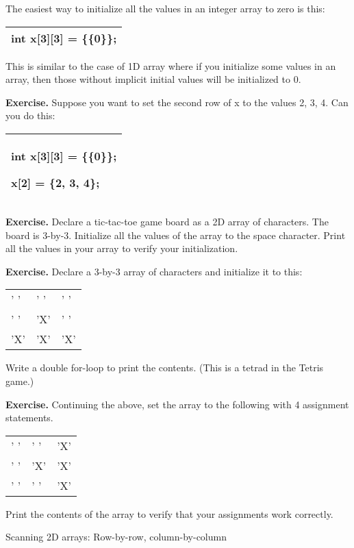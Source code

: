 \documentclass[
]{article}
\begin{document}
The easiest way to initialize all the values in an integer array to zero
is this:

\begin{longtable}[]{@{}l@{}}
\toprule
\endhead
int x{[}3{]}{[}3{]} = \{\{0\}\};\tabularnewline
\bottomrule
\end{longtable}

This is similar to the case of 1D array where if you initialize some
values in an array, then those without implicit initial values will be
initialized to 0.

\textbf{Exercise.} Suppose you want to set the second row of x to the
values 2, 3, 4. Can you do this:

\begin{longtable}[]{@{}l@{}}
\toprule
\endhead
\begin{minipage}[t]{0.97\columnwidth}\raggedright
int x{[}3{]}{[}3{]} = \{\{0\}\};

x{[}2{]} = \{2, 3, 4\};\strut
\end{minipage}\tabularnewline
\bottomrule
\end{longtable}

\textbf{Exercise.} Declare a tic-tac-toe game board as a 2D array of
characters. The board is 3-by-3. Initialize all the values of the array
to the space character. Print all the values in your array to verify
your initialization.

\textbf{Exercise.} Declare a 3-by-3 array of characters and initialize
it to this:

\begin{longtable}[]{@{}lll@{}}
\toprule
\endhead
' ' & ' ' & ' '\tabularnewline
' ' & 'X' & ' '\tabularnewline
'X' & 'X' & 'X'\tabularnewline
\bottomrule
\end{longtable}

Write a double for-loop to print the contents. (This is a tetrad in the
Tetris game.)

\textbf{Exercise. }Continuing the above, set the array to the following
with 4 assignment statements.

\begin{longtable}[]{@{}lll@{}}
\toprule
\endhead
' ' & ' ' & 'X'\tabularnewline
' ' & 'X' & 'X'\tabularnewline
' ' & ' ' & 'X'\tabularnewline
\bottomrule
\end{longtable}

Print the contents of the array to verify that your assignments work
correctly.

Scanning 2D arrays: Row-by-row, column-by-column
\end{document}
